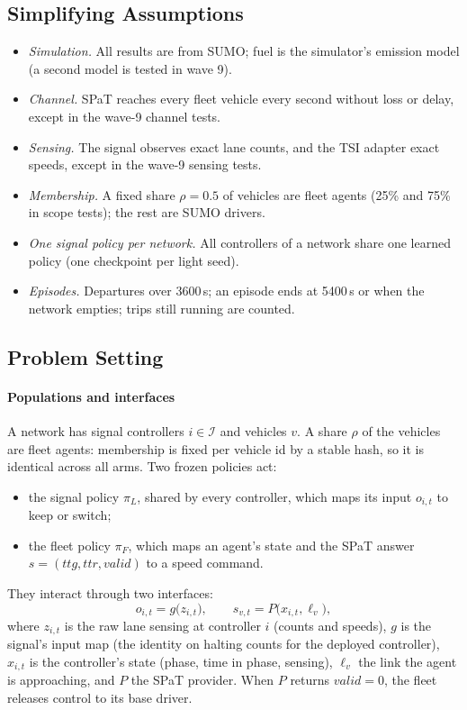 \subsection{Simplifying Assumptions}
\begin{itemize}\setlength\itemsep{1pt}
\item \emph{Simulation.} All results are from SUMO; fuel is the simulator's emission model (a second model is tested in wave 9).
\item \emph{Channel.} SPaT reaches every fleet vehicle every second without loss or delay, except in the wave-9 channel tests.
\item \emph{Sensing.} The signal observes exact lane counts, and the TSI adapter exact speeds, except in the wave-9 sensing tests.
\item \emph{Membership.} A fixed share $\rho=0.5$ of vehicles are fleet agents (25\% and 75\% in scope tests); the rest are SUMO drivers.
\item \emph{One signal policy per network.} All controllers of a network share one learned policy (one checkpoint per light seed).
\item \emph{Episodes.} Departures over 3600\,s; an episode ends at 5400\,s or when the network empties; trips still running are counted.
\end{itemize}
\subsection{Problem Setting}\label{sec:setting}
\paragraph{Populations and interfaces} A network has signal controllers $i\in\mathcal I$ and vehicles $v$. A share $\rho$ of the vehicles
are fleet agents: membership is fixed per vehicle id by a stable hash, so it is identical across all arms. Two frozen policies act:
\begin{itemize}\setlength\itemsep{0pt}
\item the signal policy $\pi_L$, shared by every controller, which maps its input $o_{i,t}$ to keep or switch;
\item the fleet policy $\pi_F$, which maps an agent's state and the SPaT answer $s=(\mathit{ttg},\mathit{ttr},\mathit{valid})$ to a speed
command.
\end{itemize}
They interact through two interfaces:
\begin{equation}
o_{i,t} = g\big(z_{i,t}\big), \qquad s_{v,t} = P\big(x_{i,t}, \ell_v\big),
\end{equation}
where $z_{i,t}$ is the raw lane sensing at controller $i$ (counts and speeds), $g$ is the signal's input map (the identity on halting
counts for the deployed controller), $x_{i,t}$ is the controller's state (phase, time in phase, sensing), $\ell_v$ the link the agent is
approaching, and $P$ the SPaT provider. When $P$ returns $\mathit{valid}=0$, the fleet releases control to its base driver.
